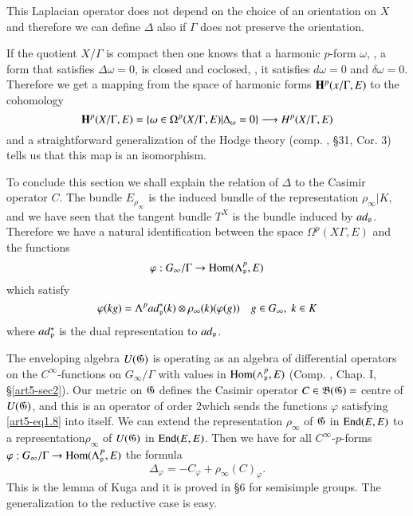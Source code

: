 This Laplacian operator does not depend on the choice of an orientation on $X$ and therefore we can define $\Delta$ also if $\Gamma$ does not preserve the orientation.

If the quotient $X / \Gamma$ is compact then one knows that a harmonic $p$-form $\omega$, \ie, a form that satisfies $\Delta \omega = 0$, is closed and coclosed, \ie, it satisfies $d \omega = 0$ and $\delta \omega = 0$. Therefore we get a mapping from the space of harmonic forms $\mathbf{H}^p (x/ \Gamma , E)$ to the cohomology
$$
\mathbf{H}^p (X/ \Gamma, E) = \{\omega \in \Omega^p (X/ \Gamma, E) | \Delta_\omega = 0 \} \longrightarrow H^p (X/ \Gamma, E)
$$
and a straightforward generalization of the Hodge theory (comp. \cite{art5-key12}, \S 31, Cor. 3) tells us that this map is an isomorphism.

To conclude this section we shall explain the relation of $\Delta$ to the Casimir operator $C$. The bundle $E_{\rho_\infty}$ is the induced bundle of the representation $\rho_\infty|K$, and we have seen that the tangent bundle $T^X$ is the bundle induced by $ad_{\mathfrak{p}}$. Therefore we have a natural identification between the space $\Omega^p (X \Gamma, E)$ and the functions
$$
\varphi : G_\infty / \Gamma \to \operatorname{Hom} (\Lambda^p_{\mathfrak{p}}, E)
$$
which satisfy
\begin{equation}
\varphi (kg) = \Lambda^p ad_{\mathfrak{p}}^\ast (k) \otimes \rho_\infty (k) (\varphi (g)) \quad g \in G_\infty, \; k \in K 
\label{art5-eq1.8}
\end{equation}
where $ad^\ast_{\mathfrak{p}}$ is the dual representation to $ad_{\mathfrak{p}}$.

The enveloping algebra $U (\mathfrak{G})$ is operating as an algebra of differential operators on the $C^\infty$-functions on $G_\infty/\Gamma$ with values in $\operatorname{Hom} (\wedge^p_{\mathfrak{p}}, E)$ (Comp. \cite{art5-key8}, Chap. I, \S \ref{art5-sec2}). Our metric on $\mathfrak{G}$ defines the Casimir operator $C \in \mathfrak{B} (\mathfrak{G}) =$ centre of $U (\mathfrak{G})$, and this is an operator of order 2which sends the functions $\varphi$ satisfying \eqref{art5-eq1.8} into itself. We can extend the representation $\rho_\infty$ of $\mathfrak{G}$ in $\operatorname{End} (E, E)$ to a representation\pageoriginale $\rho_\infty$ of $U(\mathfrak{G})$ in $\operatorname{End} (E, E)$. Then we have for all $C^\infty$-$p$-forms $\varphi: G_\infty/ \Gamma \to \operatorname{Hom} (\Lambda^P_{\mathfrak{p}}, E)$ the formula
\begin{equation}
\Delta_\varphi = - C_\varphi  + \rho_\infty (C)_\varphi. 
\label{art5-eq1.9}
\end{equation}
This is the lemma of Kuga and it is proved in \cite{art5-key10} \S 6 for semisimple groups. The generalization to the reductive case is easy.

